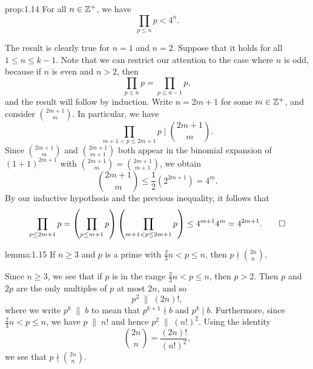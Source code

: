 \begin{prop}{prop:1.14}
For all $n \in \mathbb{Z}^+$, we have 
\[ \prod_{p\leq n} p < 4^n. \]
\end{prop}
\begin{pf}
The result is clearly true for $n = 1$ and $n = 2$. Suppose that it holds for all $1 \leq n \leq k-1$. 
Note that we can restrict our attention to the case where $n$ is odd, because if $n$ is even 
and $n > 2$, then 
\[ \prod_{p \leq n} p = \prod_{p \leq n-1} p, \]
and the result will follow by induction. Write $n = 2m+1$ for some $m \in \mathbb{Z}^+$, and consider 
$\binom{2m+1}m$. In particular, we have 
\[ \prod_{m+1<p\leq2m+1} p \; \bigg\rvert \; \binom{2m+1}m. \]
Since $\binom{2m+1}m$ and $\binom{2m+1}{m+1}$ both appear in the binomial expansion of $(1+1)^{2m+1}$
with $\binom{2m+1}m = \binom{2m+1}{m+1}$, we obtain 
\[ \binom{2m+1}m \leq \frac12 (2^{2m+1}) = 4^m. \]
By our inductive hypothesis and the previous inequality, it follows that 
\[ \prod_{p\leq 2m+1} p = \left( \prod_{p\leq m+1} p \right) \left( \prod_{m+1 < p\leq 2m+1} p \right)
\leq 4^{m+1} 4^m = 4^{2m+1}. \qedhere \]
\end{pf}

\begin{lemma}{lemma:1.15}
If $n \geq 3$ and $p$ is a prime with $\frac23n < p \leq n$, then $p \nmid \binom{2n}n$. 
\end{lemma}
\begin{pf}
Since $n \geq 3$, we see that if $p$ is in the range $\frac23n < p \leq n$, then $p > 2$. Then 
$p$ and $2p$ are the only multiples of $p$ at most $2n$, and so 
\[ p^2 \; \| \; (2n)!, \]
where we write $p^k \; \| \; b$ to mean that $p^{k+1} \nmid b$ and $p^k \mid b$. Furthermore, since 
$\frac23n < p \leq n$, we have $p \;\|\; n!$ and hence $p^2 \;\|\; (n!)^2$. Using the identity 
\[ \binom{2n}n = \frac{(2n)!}{(n!)^2}, \] we see that $p \nmid \binom{2n}n$. 
\end{pf}

